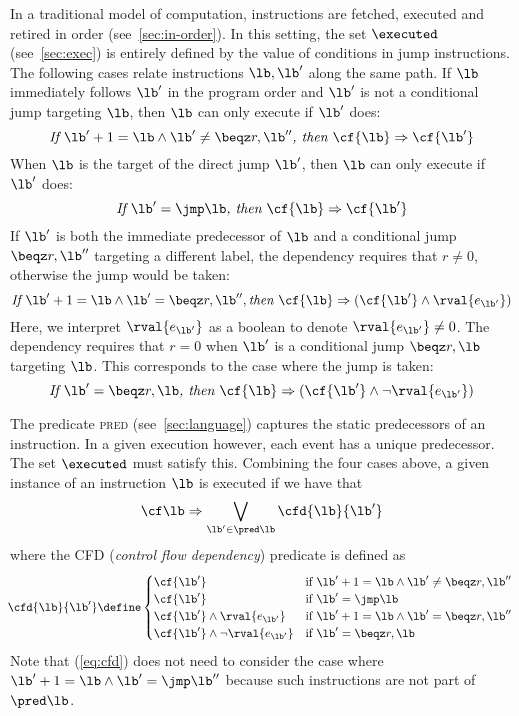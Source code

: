 \documentclass[conference]{IEEEtran}
\begin{document}
In a traditional model of computation, instructions are fetched, executed and retired in order (see~\autoref{sec:in-order}).
In this setting, the set $\executed$ (see~\autoref{sec:exec}) is entirely defined by the value of conditions in jump instructions.
The following cases relate instructions $\lb, {\lb'} $ along the same path.
  If $\lb$ immediately follows $\lb'$ in the program order and $\lb'$ is not a conditional jump targeting $\lb$, then $\lb$ can only execute if $\lb'$ does:
  $$\textit{If }\lb'+1 = \lb \land \lb' \neq \beqz r,\lb'' \textit{, then } \cf{\lb} \Rightarrow \cf{\lb'}$$
%
  When $\lb$ is the target of the direct jump $\lb'$, then $\lb$ can only execute if $\lb'$ does:
  $$\textit{If }\lb' = \jmp \lb \textit{, then } \cf{\lb} \Rightarrow \cf{\lb'}$$
%
  If $\lb'$ is both the immediate predecessor of $\lb$ and a conditional jump $\beqz r,\lb''$ targeting a different label, the dependency requires that $r \neq 0$, otherwise the jump would be taken:
  $$\textit{If }\lb'+1 = \lb \land \lb' = \beqz r,\lb'', \textit{then } \cf{\lb} \Rightarrow {({\cf{\lb'}} \land \rval{e_{\lb'}})}$$
%
  Here, we interpret $\rval{e_{\lb'}}$ as a boolean to denote $\rval{e_{\lb'}} \neq 0$.
  The dependency requires that $r = 0$ when $\lb'$ is a conditional jump $\beqz r,\lb$ targeting $\lb$. 
  This corresponds to the case where the jump is taken: 
  $$\textit{If }\lb' = \beqz r,\lb \textit{, then } \cf{\lb} \Rightarrow {({\cf{\lb'}} \land {\neg \rval{e_{\lb'}}})}$$

The predicate \textsc{pred} (see~\autoref{sec:language}) captures the static predecessors of an instruction.
In a given execution however, each event has a unique predecessor.
The set $\executed$ must satisfy this.
Combining the four cases above, a given instance of an instruction $\lb$ is executed if we have that
\begin{equation}
\label{eq:cf}
{\cf \lb} \Rightarrow {\bigvee\limits_{{\lb'} \in \pred \lb} \cfd{\lb}{\lb'}}
\end{equation}
where the \textsc{CFD} (\emph{control flow dependency}) predicate is defined as
{\small
\begin{equation}
\label{eq:cfd}
\hspace*{-1mm}\cfd{\lb}{\lb'} \define 
     \begin{cases}
       \cf{\lb'} & \text{if } \lb'+1 = \lb \land \lb' \neq \beqz r,\lb'' \\
       \cf{\lb'} & \text{if } \lb' = \jmp \lb \\
       {{\cf{\lb'}} \land \rval{e_{\lb'}}} & \text{if } \lb'+1 = \lb \land \lb' = \beqz r,\lb'' \\
       {{\cf{\lb'}} \land {\neg \rval{e_{\lb'}}}} & \text{if } \lb' = \beqz r,\lb \\
     \end{cases}
\end{equation}}
Note that (\ref{eq:cfd}) does not need to consider the case where $\lb'+1 = \lb \land \lb' = \jmp \lb''$ because such instructions are not part of $\pred \lb$.
\end{document}
